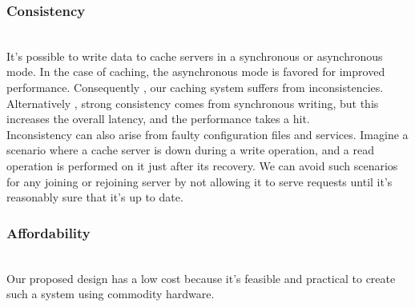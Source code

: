 \subsubsection{Consistency}\label{PUEJC5M_6QAT8XojaiZ_j}
\\
It's possible to write data to cache servers in a synchronous or asynchronous mode. In the case of caching, the asynchronous mode is favored for improved performance. Consequently , our caching system suffers from inconsistencies. Alternatively
, strong consistency comes from synchronous writing, but this increases the overall latency, and the performance takes a hit.
\\
Inconsistency can also arise from faulty configuration files and services. Imagine a scenario where a cache server is down during a write operation, and a read operation is performed on it just after its recovery. We can avoid such scenarios for any joining or rejoining server by not allowing it to serve requests until it's reasonably sure that it's up to date.

\subsubsection{Affordability}\label{yKV8N9u3Ied-y4N7pmjoa}
\\
Our proposed design has a low cost because it's feasible and practical to create such a system using commodity hardware.

